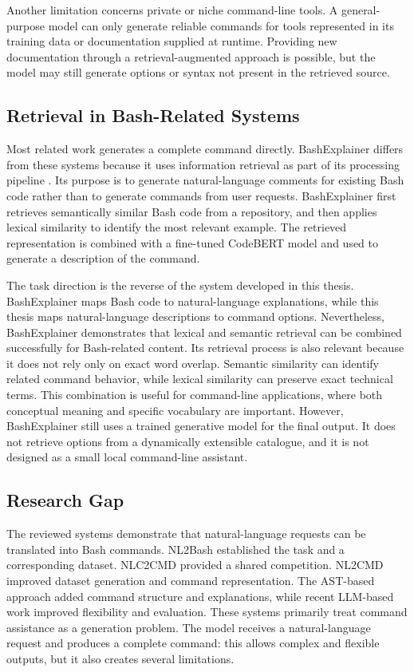 Another limitation concerns private or niche command-line tools. A general-purpose model can only generate reliable commands for tools represented in its training data or documentation supplied at runtime. Providing new documentation through a retrieval-augmented approach is possible, but the model may still generate options or syntax not present in the retrieved source.

\subsection{Retrieval in Bash-Related Systems}
Most related work generates a complete command directly. BashExplainer differs from these systems because it uses information retrieval as part of its processing pipeline \cite{yu2022bashexplainer}. Its purpose is to generate natural-language comments for existing Bash code rather than to generate commands from user requests.
BashExplainer first retrieves semantically similar Bash code from a repository, and then applies lexical similarity to identify the most relevant example. The retrieved representation is combined with a fine-tuned CodeBERT model and used to generate a description of the command.

The task direction is the reverse of the system developed in this thesis. BashExplainer maps Bash code to natural-language explanations, while this thesis maps natural-language descriptions to command options. Nevertheless, BashExplainer demonstrates that lexical and semantic retrieval can be combined successfully for Bash-related content. Its retrieval process is also relevant because it does not rely only on exact word overlap. Semantic similarity can identify related command behavior, while lexical similarity can preserve exact technical terms. This combination is useful for command-line applications, where both conceptual meaning and specific vocabulary are important.
However, BashExplainer still uses a trained generative model for the final output. It does not retrieve options from a dynamically extensible catalogue, and it is not designed as a small local command-line assistant.

\subsection{Research Gap}
The reviewed systems demonstrate that natural-language requests can be translated into Bash commands. NL2Bash established the task and a corresponding dataset. NLC2CMD provided a shared competition. NL2CMD improved dataset generation and command representation. The AST-based approach added command structure and explanations, while recent LLM-based work improved flexibility and evaluation. These systems primarily treat command assistance as a generation problem. The model receives a natural-language request and produces a complete command: this allows complex and flexible outputs, but it also creates several limitations.

